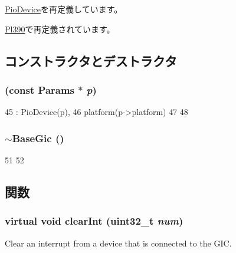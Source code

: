 \hyperlink{classPioDevice_a9cdbda5b5cc24147ce82b7d07bf03cd1}{PioDevice}を再定義しています。

\hyperlink{classPl390_a1ac197c7f5e1a7b8d7178444a1474e45}{Pl390}で再定義されています。

\subsection{コンストラクタとデストラクタ}
\hypertarget{classBaseGic_a99b5d5275b2233fb5e7a41c6f2f73b61}{
\subsubsection[{BaseGic}]{ (const {\bf Params} $\ast$ {\em p})}}
\label{classBaseGic_a99b5d5275b2233fb5e7a41c6f2f73b61}



\begin{DoxyCode}
45         : PioDevice(p),
46           platform(p->platform)
47 {
48 }
\end{DoxyCode}
\hypertarget{classBaseGic_a8dfc74b03784d7a41971842bced51615}{
\subsubsection[{$\sim$BaseGic}]{\setlength{\rightskip}{0pt plus 5cm}$\sim${\bf BaseGic} ()}}
\label{classBaseGic_a8dfc74b03784d7a41971842bced51615}



\begin{DoxyCode}
51 {
52 }
\end{DoxyCode}


\subsection{関数}
\hypertarget{classBaseGic_a969450946c91b2daf6aa8ab1a60aa8c2}{
\subsubsection[{clearInt}]{\setlength{\rightskip}{0pt plus 5cm}virtual void clearInt ({\bf uint32\_\-t} {\em num})}}
\label{classBaseGic_a969450946c91b2daf6aa8ab1a60aa8c2}
Clear an interrupt from a device that is connected to the GIC.

